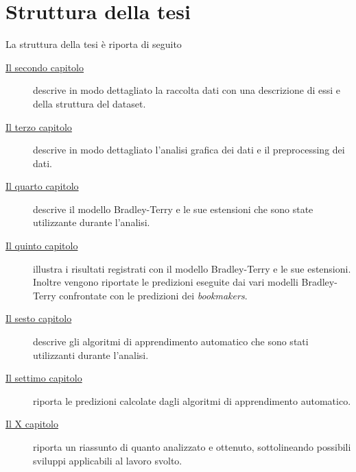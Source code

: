 \section{Struttura della tesi}
La struttura della tesi è riporta di seguito
\begin{description}

\item[{\hyperref[cap:dataset]{Il secondo capitolo}}] descrive in modo dettagliato la raccolta dati con una descrizione di essi e della struttura del dataset. 
\item[{\hyperref[cap:Analisi]{Il terzo capitolo}}] descrive in modo dettagliato l'analisi grafica dei dati e il preprocessing dei dati. 
\item[{\hyperref[cap:BT]{Il quarto capitolo}}] descrive il modello Bradley-Terry e le sue estensioni che sono state utilizzante durante l'analisi.
\item[{\hyperref[cap:risultatiDM]{Il quinto capitolo}}] illustra i risultati registrati con il modello Bradley-Terry e le sue estensioni. Inoltre vengono riportate le predizioni eseguite dai vari modelli Bradley-Terry confrontate con le predizioni dei \emph{bookmakers}.
\item[{\hyperref[cap:ML]{Il sesto capitolo}}] descrive gli algoritmi di apprendimento automatico che sono stati utilizzanti durante l'analisi.
\item[{\hyperref[cap:RisML]{Il settimo capitolo}}] riporta le predizioni calcolate dagli algoritmi di apprendimento automatico.
\item[{\hyperref[cap:conclusioni]{Il X capitolo}}] riporta un riassunto di quanto analizzato e ottenuto, sottolineando possibili sviluppi applicabili al lavoro svolto.
\end{description}





\begin{comment}
\begin{figure}[h]
	\begin{center}
		\texttt{[image: Logo\_azzurrodigite.png]}
		\caption{Logo di AzzurroDigitale}
	\end{center}
\end{figure}	contenuto...
\end{comment}






    
    
    
